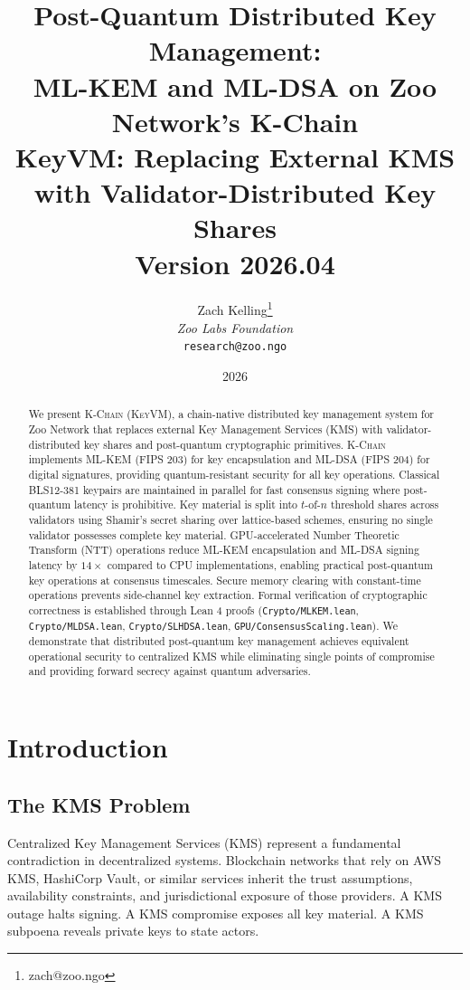 \documentclass[11pt,letterpaper]{article}
\title{\textbf{Post-Quantum Distributed Key Management:\\ML-KEM and ML-DSA on Zoo Network's K-Chain}\\
\large KeyVM: Replacing External KMS with Validator-Distributed Key Shares\\
\vspace{5pt}
\normalsize Version 2026.04}
\author{
Zach Kelling\thanks{zach@zoo.ngo}\\
\textit{Zoo Labs Foundation}\\
\texttt{research@zoo.ngo}
}
\date{2026}
\theoremstyle{definition}
\theoremstyle{remark}
\newcommand{\KChain}{\textsc{K-Chain}}
\newcommand{\KeyVM}{\textsc{KeyVM}}
\begin{document}
\zoocoverpage

\begin{abstract}
We present \KChain{} (\KeyVM{}), a chain-native distributed key management system for Zoo Network that replaces external Key Management Services (KMS) with validator-distributed key shares and post-quantum cryptographic primitives. \KChain{} implements ML-KEM (FIPS 203) for key encapsulation and ML-DSA (FIPS 204) for digital signatures, providing quantum-resistant security for all key operations. Classical BLS12-381 keypairs are maintained in parallel for fast consensus signing where post-quantum latency is prohibitive. Key material is split into $t$-of-$n$ threshold shares across validators using Shamir's secret sharing over lattice-based schemes, ensuring no single validator possesses complete key material. GPU-accelerated Number Theoretic Transform (NTT) operations reduce ML-KEM encapsulation and ML-DSA signing latency by $14\times$ compared to CPU implementations, enabling practical post-quantum key operations at consensus timescales. Secure memory clearing with constant-time operations prevents side-channel key extraction. Formal verification of cryptographic correctness is established through Lean 4 proofs (\texttt{Crypto/MLKEM.lean}, \texttt{Crypto/MLDSA.lean}, \texttt{Crypto/SLHDSA.lean}, \texttt{GPU/ConsensusScaling.lean}). We demonstrate that distributed post-quantum key management achieves equivalent operational security to centralized KMS while eliminating single points of compromise and providing forward secrecy against quantum adversaries.
\end{abstract}

\tableofcontents
\newpage

\section{Introduction}

\subsection{The KMS Problem}

Centralized Key Management Services (KMS) represent a fundamental contradiction in decentralized systems. Blockchain networks that rely on AWS KMS, HashiCorp Vault, or similar services inherit the trust assumptions, availability constraints, and jurisdictional exposure of those providers. A KMS outage halts signing. A KMS compromise exposes all key material. A KMS subpoena reveals private keys to state actors.
\end{document}

